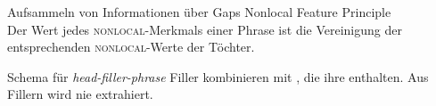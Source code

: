 \begin{frame}
  {Aufsammeln von Informationen über Gaps}
  \onslide<+->
  \onslide<+->
  \alert{Nonlocal Feature Principle} \\
  \Zeile
  \centering 
  \onslide<+->
  \Large Der Wert jedes \textsc{nonlocal}-Merkmals einer Phrase ist die Vereinigung der entsprechenden \textsc{nonlocal}-Werte der Töchter.\\
  \onslide<+->
  \Zeile
  \footnotesize
\end{frame}

\begin{frame}
  {Schema für \textit{head-filler-phrase}}
  \onslide<+->
  \onslide<+->
  Filler kombinieren mit , die ihre  enthalten. Aus Fillern wird \alert{nie extrahiert}.\\
  \onslide<+->
  \Doppelzeile
  \centering 
\end{frame}

